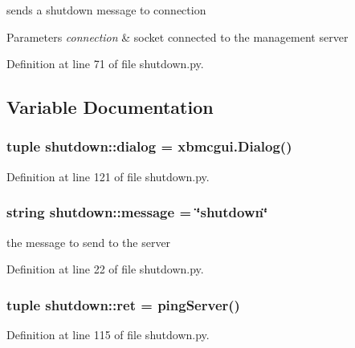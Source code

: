 sends a shutdown message to connection 


\begin{DoxyParams}{Parameters}
{\em connection} & socket connected to the management server \\
\hline
\end{DoxyParams}


Definition at line 71 of file shutdown.py.



\subsection{Variable Documentation}
\hypertarget{namespaceshutdown_a8cc315dfddb9647fbb6d094512ff33dd}{
\subsubsection[{dialog}]{\setlength{\rightskip}{0pt plus 5cm}tuple {\bf shutdown::dialog} = xbmcgui.Dialog()}}
\label{namespaceshutdown_a8cc315dfddb9647fbb6d094512ff33dd}


Definition at line 121 of file shutdown.py.

\hypertarget{namespaceshutdown_a5a308da7ea4ff7f97f5e5060e3bd944c}{
\subsubsection[{message}]{\setlength{\rightskip}{0pt plus 5cm}string {\bf shutdown::message} = \char`\"{}shutdown\char`\"{}}}
\label{namespaceshutdown_a5a308da7ea4ff7f97f5e5060e3bd944c}


the message to send to the server 



Definition at line 22 of file shutdown.py.

\hypertarget{namespaceshutdown_aa29f20a41b6c1a0ddf489a61f5507457}{
\subsubsection[{ret}]{\setlength{\rightskip}{0pt plus 5cm}tuple {\bf shutdown::ret} = pingServer()}}
\label{namespaceshutdown_aa29f20a41b6c1a0ddf489a61f5507457}


Definition at line 115 of file shutdown.py.

